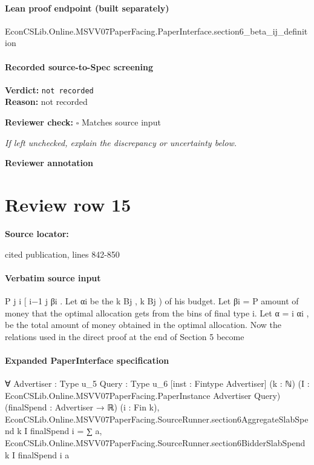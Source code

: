 \documentclass[10pt]{article}
\newcommand{\reviewerbox}{%
  \par\noindent\fbox{\parbox{0.96\linewidth}{\rule{0pt}{0.38in}}}\par
}
\newcommand{\reviewmatch}[1]{%
  \par\noindent\textbf{Reviewer check:} $\square$\; #1\par
  \noindent\emph{If left unchecked, explain the discrepancy or uncertainty below.}\par
}
\begin{document}
\paragraph{Lean proof endpoint (built separately)}\begin{ReviewVerbatim}
EconCSLib.Online.MSVV07PaperFacing.PaperInterface.section6_beta_ij_definition
\end{ReviewVerbatim}

\paragraph{Recorded source-to-Spec screening}
\textbf{Verdict:} \texttt{not recorded}
\\
\textbf{Reason:} not recorded
\reviewmatch{Matches source input}
\noindent\textbf{Reviewer annotation}\par
\reviewerbox
\clearpage
\hypertarget{source-claim-3afc6a9cc9ca101b}{}
\section*{Review row 15}
\textbf{Source locator:} {\footnotesize\raggedright cited publication, lines 842-\allowbreak{}850\par}
\paragraph{Verbatim source input}
\begin{ReviewVerbatim}
P j
i
[ i−1
j βi . Let αi be the
k Bj , k Bj ) of his budget. Let βi =
P amount of money that the optimal
allocation gets from the bins of final type i. Let α = i αi , be the total amount of money
obtained in the optimal allocation.
Now the relations used in the direct proof at the end of Section 5 become
\end{ReviewVerbatim}


\paragraph{Expanded PaperInterface specification}
\begin{ReviewVerbatim}
∀ {Advertiser : Type u_5} {Query : Type u_6} [inst : Fintype Advertiser] (k : ℕ)
  (I : EconCSLib.Online.MSVV07PaperFacing.PaperInstance Advertiser Query) (finalSpend : Advertiser → ℝ) (i : Fin k),
  EconCSLib.Online.MSVV07PaperFacing.SourceRunner.section6AggregateSlabSpend k I finalSpend i =
    ∑ a, EconCSLib.Online.MSVV07PaperFacing.SourceRunner.section6BidderSlabSpend k I finalSpend i a
\end{ReviewVerbatim}
\end{document}
